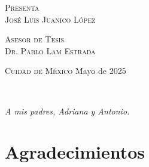 \vspace{5pt}

\begin{center}
    \begin{minipage}{0.7\textwidth}
        \centering
        {\normalsize\textsc{Presenta}} \\
        {\Large\textsc{José Luis Juanico López}}
        \medskip
    \end{minipage}
\end{center}

\hspace{10pt}

\begin{center}
    \begin{minipage}{0.7\textwidth}
        \centering
        {\normalsize\textsc{Asesor de Tesis}} \\
        {\normalsize\textsc{Dr. Pablo Lam Estrada}}
        \medskip
    \end{minipage}
\end{center}

\vfill

\begin{center}
    \begin{minipage}{0.8\textwidth}
        {\normalsize\textsc{Cuidad de México} \hfill {\small Mayo de 2025}}
    \end{minipage}
\end{center}

\newpage
\thispagestyle{empty}
\

\newpage
{}
\thispagestyle{empty}
\hfill\textit{A mis padres, Adriana y Antonio.}
\newpage
\thispagestyle{empty}
\

\newpage
{}
\thispagestyle{plain}
\section*{Agradecimientos}

